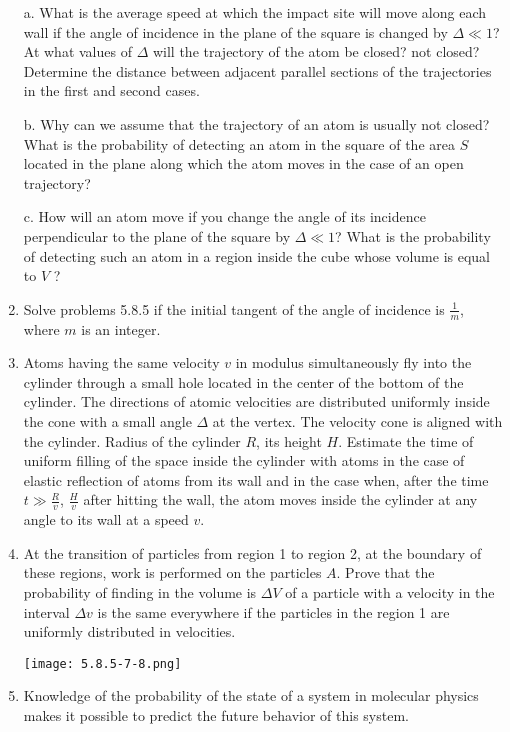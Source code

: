 \documentclass{article}
\begin{document}
\begin{enumerate}[label=5.8.\arabic*]
a. What is the average speed at which the impact site will move along each wall if the angle of incidence in the plane of the square is changed by $\Delta \ll 1$? At what values of $\Delta$ will the trajectory of the atom be closed? not closed? Determine the distance between adjacent parallel sections of the trajectories in the first and second cases. 

b. Why can we assume that the trajectory of an atom is usually not closed? What is the probability of detecting an atom in the square of the area $S$ located in the plane along which the atom moves in the case of an open trajectory? 

c. How will an atom move if you change the angle of its incidence perpendicular to the plane of the square by $\Delta \ll 1$? What is the probability of detecting such an atom in a region inside the cube whose volume is equal to $V$ ?

\item Solve problems 5.8.5 if the initial tangent of the angle of incidence is $\frac{1}{m}$, where $m$ is an integer.

\item Atoms having the same velocity $v$ in modulus simultaneously fly into the cylinder through a small hole located in the center of the bottom of the cylinder. The directions of atomic velocities are distributed uniformly inside the cone with a small angle $\Delta$ at the vertex. The velocity cone is aligned with the cylinder. Radius of the cylinder $R$, its height $H$. Estimate the time of uniform filling of the space inside the cylinder with atoms in the case of elastic reflection of atoms from its wall and in the case when, after the time $t \gg \frac{R}{v}$, $\frac{H}{v}$ after hitting the wall, the atom moves inside the cylinder at any angle to its wall at a speed $v$.

\item At the transition of particles from region 1 to region 2, at the boundary of these regions, work is performed on the particles $A$. Prove that the probability of finding in the volume is $\Delta V$ of a particle with a velocity in the interval $\Delta v$ is the same everywhere if the particles in the region 1 are uniformly distributed in velocities.

\begin{center}
    \texttt{[image: 5.8.5-7-8.png]}
\end{center}

\item Knowledge of the probability of the state of a system in molecular physics makes it possible to predict the future behavior of this system.


\end{enumerate}
\end{document}
